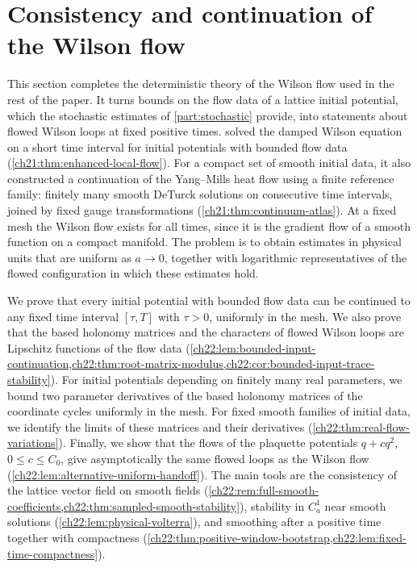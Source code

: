 \chapter{Consistency and continuation of the Wilson flow}\label{ch22:chapter}

This section completes the deterministic theory of the Wilson flow used in the rest of the paper. It turns bounds on the flow data of a lattice initial potential, which the stochastic estimates of \cref{part:stochastic} provide, into statements about flowed Wilson loops at fixed positive times.  solved the damped Wilson equation on a short time interval for initial potentials with bounded flow data (\cref{ch21:thm:enhanced-local-flow}). For a compact set of smooth initial data, it also constructed a continuation of the Yang--Mills heat flow using a finite reference family: finitely many smooth DeTurck solutions on consecutive time intervals, joined by fixed gauge transformations (\cref{ch21:thm:continuum-atlas}). At a fixed mesh the Wilson flow exists for all times, since it is the gradient flow of a smooth function on a compact manifold. The problem is to obtain estimates in physical units that are uniform as $a\to0$, together with logarithmic representatives of the flowed configuration in which these estimates hold.

We prove that every initial potential with bounded flow data can be continued to any fixed time interval $[\tau,T]$ with $\tau>0$, uniformly in the mesh. We also prove that the based holonomy matrices and the characters of flowed Wilson loops are Lipschitz functions of the flow data (\cref{ch22:lem:bounded-input-continuation,ch22:thm:root-matrix-modulus,ch22:cor:bounded-input-trace-stability}). For initial potentials depending on finitely many real parameters, we bound two parameter derivatives of the based holonomy matrices of the coordinate cycles uniformly in the mesh. For fixed smooth families of initial data, we identify the limits of these matrices and their derivatives (\cref{ch22:thm:real-flow-variations}). Finally, we show that the flows of the plaquette potentials $q+cq^2$, $0\le c\le C_0$, give asymptotically the same flowed loops as the Wilson flow (\cref{ch22:lem:alternative-uniform-handoff}). The main tools are the consistency of the lattice vector field on smooth fields (\cref{ch22:rem:full-smooth-coefficients,ch22:thm:sampled-smooth-stability}), stability in $C^1_a$ near smooth solutions (\cref{ch22:lem:physical-volterra}), and smoothing after a positive time together with compactness (\cref{ch22:thm:positive-window-bootstrap,ch22:lem:fixed-time-compactness}).

